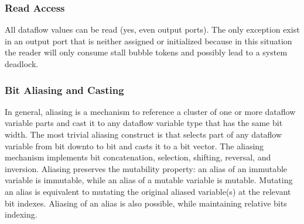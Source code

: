 \subsubsection{Read Access}
All dataflow values can be read (yes, even output ports). The only exception exist in an output port that is neither assigned or initialized because in this situation the reader will only consume stall bubble tokens and possibly lead to a system deadlock.

\subsubsection{Bit Aliasing and Casting} 
In general, aliasing is a mechanism to reference a cluster of one or more dataflow variable parts and cast it to any dataflow variable type that has the same bit width. The most trivial aliasing construct is  that selects part of any dataflow variable from bit  downto to bit  and casts it to a bit vector. The aliasing mechanism implements bit concatenation, selection, shifting, reversal, and inversion. Aliasing preserves the mutability property: an alias of an immutable variable is immutable, while an alias of a mutable variable is mutable. Mutating an alias is equivalent to mutating the original aliased variable(s) at the relevant bit indexes. Aliasing of an alias is also possible, while maintaining relative bits indexing.  

